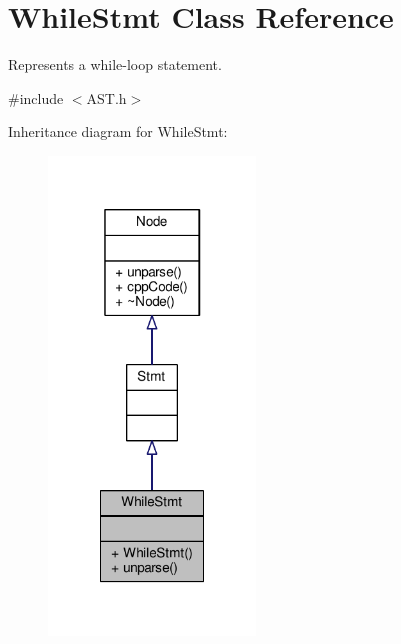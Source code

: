 \hypertarget{classWhileStmt}{\section{While\-Stmt Class Reference}
\label{classWhileStmt}
}


Represents a while-\/loop statement. \par
  




{\ttfamily \#include $<$A\-S\-T.\-h$>$}



Inheritance diagram for While\-Stmt\-:\nopagebreak
\begin{figure}[H]
\begin{center}
\leavevmode
\includegraphics[width=156pt]{classWhileStmt__inherit__graph}
\end{center}
\end{figure}


